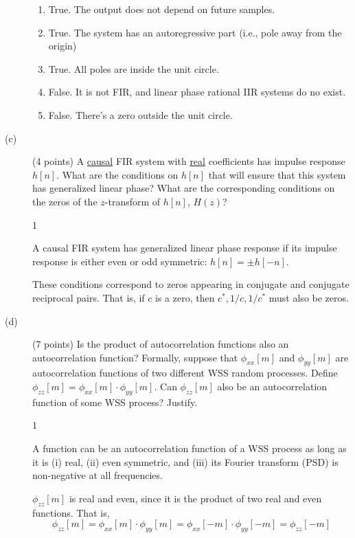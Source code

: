 \documentclass[10pt]{article}
\def\SOLUTIONS{1} %
\def\SolutionsColor{red2}
\begin{document}
\begin{description}
{\begin{enumerate}
  \item True. The output does not depend on future samples.
  \item True. The system has an autoregressive part (i.e., pole away from the origin)
  \item True. All poles are inside the unit circle.
  \item False. It is not FIR, and linear phase rational IIR systems do no exist.
  \item False. There's a zero outside the unit circle.
\end{enumerate}
}
\else\vspace{3.5cm}
\fi

%
\item[(c)] (4 points) A \underline{causal} FIR system with \underline{real} coefficients has impulse response $h[n]$. What are the conditions on $h[n]$ that will ensure that this system has generalized linear phase? What are the corresponding conditions on the zeros of the $z$-transform of $h[n]$, $H(z)$?

\if\SOLUTIONS1
{\color{\SolutionsColor} 
A causal FIR system has generalized linear phase response if its impulse response is either even or odd symmetric: $h[n] = \pm h[-n]$.

These conditions correspond to zeros appearing in conjugate and conjugate reciprocal pairs. That is, if $c$ is a zero, then $c^*, 1/c, 1/c^*$ must also be zeros.

}
\else\vspace{5cm}
\fi

%
\item[(d)] (7 points) Is the product of autocorrelation functions also an autocorrelation function? Formally, suppose that $\phi_{xx}[m]$ and $\phi_{yy}[m]$ are autocorrelation functions of two different WSS random processes. Define $\phi_{zz}[m] = \phi_{xx}[m]\cdot \phi_{yy}[m]$. Can $\phi_{zz}[m]$ also be an autocorrelation function of some WSS process? Justify.

\if\SOLUTIONS1
{\color{\SolutionsColor}
A function can be an autocorrelation function of a WSS process as long as it is (i) real, (ii) even symmetric, and (iii) its Fourier transform (PSD) is non-negative at all frequencies. 

$\phi_{zz}[m]$ is real and even, since it is the product of two real and even functions. That is, 
\begin{equation*}
\phi_{zz}[m] = \phi_{xx}[m]\cdot \phi_{yy}[m] = \phi_{xx}[-m]\cdot \phi_{yy}[-m] = \phi_{zz}[-m]
\end{equation*}

}
\end{description}
\end{document}
